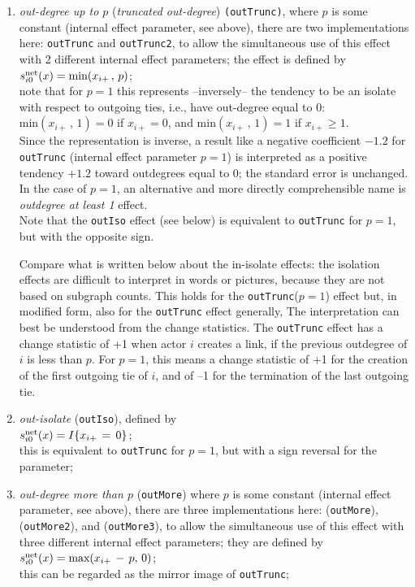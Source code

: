 \documentclass[a4paper,fleqn,11pt]{article}
\newcommand{\+}{\, + \,}
\newcommand{\vit}{\theenumi}
\begin{document}
\begin{enumerate}
 \item {\em out-degree up to $p$} (\emph{truncated out-degree}) \texttt{(outTrunc)},
 where $p$ is some constant
 (internal effect parameter, see above),  there are two implementations here:
 \texttt{outTrunc} and \texttt{outTrunc2}, to allow the simultaneous use of this
 effect with 2 different internal effect parameters; the effect is
 defined by  \\
 $s^{\rm net}_{i\vit}(x) = \text{min}(x_{i+}\,,\, p)$;\\
 note that for $p=1$ this represents --inversely-- the tendency to be an isolate
 with respect to outgoing ties, i.e., have out-degree equal to 0:
 $ \text{min}(x_{i+}\,,\, 1) = 0$ if $x_{i+} = 0$, and
 $ \text{min}(x_{i+}\,,\, 1) = 1$ if $x_{i+} \geq 1$.\\
 Since the representation is inverse, a result like a negative coefficient
 $ -1.2$ for \texttt{outTrunc} (internal effect parameter $p=1$) is interpreted
 as a positive tendency $+1.2$ toward outdegrees equal to 0; the standard
 error is unchanged. In the case of $p=1$, an alternative and more directly
 comprehensible name is \emph{outdegree at least 1} effect.\\
 Note that the \texttt{outIso} effect (see below) is equivalent
 to \texttt{outTrunc} for $p=1$, but with the opposite sign.

 Compare what is written below about the in-isolate effects:
     the isolation effects are difficult to interpret in words or pictures,
     because they are not based on subgraph counts.
 This holds for the \texttt{outTrunc}($p=1$) effect but, in modified form,
 also for the \texttt{outTrunc} effect generally,
 The interpretation can best be understood from the change statistics.
 The \texttt{outTrunc} effect has a change statistic of +1 when actor $i$
 creates a link, if the previous outdegree of $i$ is less than $p$.
 For $p=1$, this means a change statistic of +1 for the creation of the
 first outgoing tie of $i$, and of --1 for the termination of the last outgoing tie.

 \item {\em out-isolate} (\texttt{outIso}), defined by \\
 $s^{\rm net}_{i\vit}(x) = I\{x_{i+} \,=\,  0\}$;\\
 this is equivalent to \texttt{outTrunc} for $p=1$,
 but with a sign reversal for the parameter;


 \item {\em out-degree more than $p$} (\texttt{outMore}) where $p$ is some constant
 (internal effect parameter, see above),
  there are three implementations here:
 (\texttt{outMore}), (\texttt{outMore2}), and (\texttt{outMore3}),
 to allow the simultaneous use of this
 effect with three different internal effect parameters;
 they are defined by \\
 $s^{\rm net}_{i\vit}(x) = \text{max}(x_{i+}\,-\, p, \, 0)$;\\
 this can be regarded as the mirror image of \texttt{outTrunc};


\end{enumerate}
\end{document}
